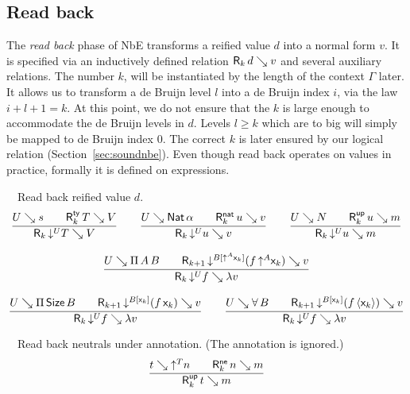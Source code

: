 \documentclass[acmsmall%
]{acmart}\settopmatter{printfolios=true}
\begin{document}
\subsection{Read back}
\label{sec:read}

The \emph{read back} phase of NbE \cite{gregoireLeroy:icfp02}
transforms a reified value $d$ into a normal form $v$.  It is
specified via an inductively defined relation $\mathsf{R}_{k} \, d \searrow v$ and several auxiliary relations.
The number $k$, will be instantiated by the length of the context
$\Gamma$ later.  It allows us to transform a de Bruijn level $l$ into a de
Bruijn index $i$, via the law $i + l + 1 = k$.  At this point, we do
not ensure that the $k$ is large enough to accommodate the de Bruijn
levels in $d$.  Levels $l \geq k$ which are to big will simply be mapped
to de Bruijn index $0$.  The correct $k$ is later ensured by our
logical relation (Section~\ref{sec:soundnbe}).
Even though read back operates on values in practice, formally it is
defined on expressions.

\noindent
{}\ \ Read back reified value $d$.
\begin{gather*}
  \ru{U \evalsto s \qquad
      \RTy k T V
    }{\R k {\down{U} T} V}
\qquad
  \ru{U \evalsto \Nat \alpha \qquad
      \RNat k u v
    }{\R k {\down{U} u} v}
\qquad
  \ru{U \evalsto N \qquad
      \RUp k u m
    }{\R k {\down{U} u} m}
\\[2ex]
  \ru{U \evalsto \piT A B \qquad
      \R{k+1} {\down{B[\up A \lev k]} (f\,\up A \lev k)} v
    }{\R k {\down{U} f} {\lambda v}}
\\[2ex]
  \ru{U \evalsto \piT \Size B \qquad
      \R{k+1} {\down{B[\lev k]} (f\,\lev k)} v
    }{\R k {\down{U} f} {\lambda v}}
\qquad
  \ru{U \evalsto \forallT B \qquad
      \R{k+1} {\down{B[\lev k]} (f\,\ann{\lev k})} v
    }{\R k {\down{U} f} {\lambda v}}
\end{gather*}

\noindent
{}\ \  Read back neutrals under annotation.  (The annotation is ignored.)
\begin{gather*}
  \ru{t \evalsto \up T n \qquad
      \RNe k n m
    }{\RUp k t m}
\end{gather*}
\end{document}
